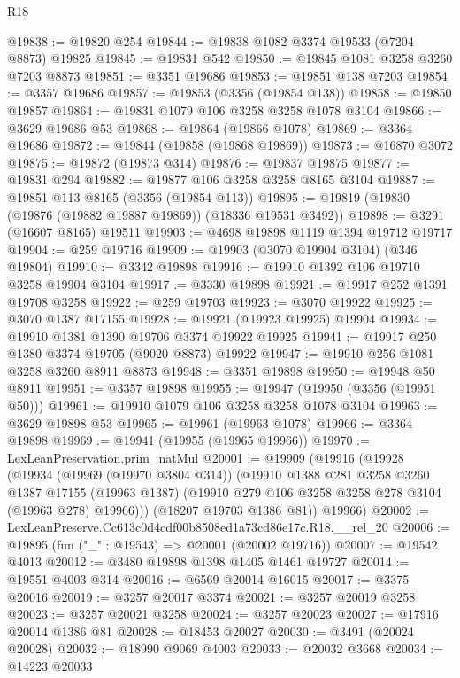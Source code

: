 \begin{lexlean}{R18}
\begin{coremodule}
@19838 := @19820 @254
@19844 := @19838 @1082 @3374 @19533 (@7204 @8873) @19825
@19845 := @19831 @542
@19850 := @19845 @1081 @3258 @3260 @7203 @8873
@19851 := @3351 @19686
@19853 := @19851 @138 @7203
@19854 := @3357 @19686
@19857 := @19853 (@3356 (@19854 @138))
@19858 := @19850 @19857
@19864 := @19831 @1079 @106 @3258 @3258 @1078 @3104
@19866 := @3629 @19686 @53
@19868 := @19864 (@19866 @1078)
@19869 := @3364 @19686
@19872 := @19844 (@19858 (@19868 @19869))
@19873 := @16870 @3072
@19875 := @19872 (@19873 @314)
@19876 := @19837 @19875
@19877 := @19831 @294
@19882 := @19877 @106 @3258 @3258 @8165 @3104
@19887 := @19851 @113 @8165 (@3356 (@19854 @113))
@19895 := @19819 (@19830 (@19876 (@19882 @19887 @19869)) (@18336 @19531 @3492))
@19898 := @3291 (@16607 @8165) @19511
@19903 := @4698 @19898 @1119 @1394 @19712 @19717
@19904 := @259 @19716
@19909 := @19903 (@3070 @19904 @3104) (@346 @19804)
@19910 := @3342 @19898
@19916 := @19910 @1392 @106 @19710 @3258 @19904 @3104
@19917 := @3330 @19898
@19921 := @19917 @252 @1391 @19708 @3258
@19922 := @259 @19703
@19923 := @3070 @19922
@19925 := @3070 @1387 @17155
@19928 := @19921 (@19923 @19925) @19904
@19934 := @19910 @1381 @1390 @19706 @3374 @19922 @19925
@19941 := @19917 @250 @1380 @3374 @19705 (@9020 @8873) @19922
@19947 := @19910 @256 @1081 @3258 @3260 @8911 @8873
@19948 := @3351 @19898
@19950 := @19948 @50 @8911
@19951 := @3357 @19898
@19955 := @19947 (@19950 (@3356 (@19951 @50)))
@19961 := @19910 @1079 @106 @3258 @3258 @1078 @3104
@19963 := @3629 @19898 @53
@19965 := @19961 (@19963 @1078)
@19966 := @3364 @19898
@19969 := @19941 (@19955 (@19965 @19966))
@19970 := LexLeanPreservation.prim_natMul
@20001 := @19909
    (@19916
      (@19928
        (@19934
          (@19969 (@19970 @3804 @314))
          (@19910
            @1388
            @281
            @3258
            @3260
            @1387
            @17155
            (@19963 @1387)
            (@19910 @279 @106 @3258 @3258 @278 @3104 (@19963 @278) @19966)))
        (@18207 @19703 @1386 @81))
      @19966)
@20002 := LexLeanPreserve.Cc613c0d4cdf00b8508ed1a73cd86e17c.R18.__rel_20
@20006 := @19895 (fun ("_" : @19543) => @20001 (@20002 @19716))
@20007 := @19542 @4013
@20012 := @3480 @19898 @1398 @1405 @1461 @19727
@20014 := @19551 @4003 @314
@20016 := @6569 @20014 @16015
@20017 := @3375 @20016
@20019 := @3257 @20017 @3374
@20021 := @3257 @20019 @3258
@20023 := @3257 @20021 @3258
@20024 := @3257 @20023
@20027 := @17916 @20014 @1386 @81
@20028 := @18453 @20027
@20030 := @3491 (@20024 @20028)
@20032 := @18990 @9069 @4003
@20033 := @20032 @3668
@20034 := @14223 @20033

\end{coremodule}
\end{lexlean}
